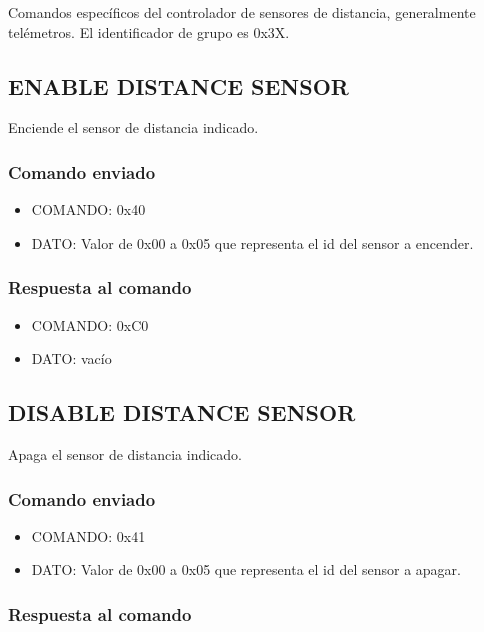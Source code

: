 \documentclass[a4paper,10pt]{article}
\begin{document}
Comandos espec\'ificos del controlador de sensores de distancia, generalmente tel\'emetros.
El identificador de grupo es 0x3X.

\subsection{ENABLE DISTANCE SENSOR}
\label{enable_distance_sensor}

Enciende el sensor de distancia indicado.

\subsubsection*{Comando enviado}

\begin{itemize}
	\item{COMANDO:} 0x40
	\item{DATO:} Valor de 0x00 a 0x05 que representa el id del sensor a encender.
\end{itemize}

\subsubsection*{Respuesta al comando}

\begin{itemize}
	\item{COMANDO:} 0xC0
	\item{DATO:} vac\'io
\end{itemize}

\subsection{DISABLE DISTANCE SENSOR}
\label{disable_distance_sensor}

Apaga el sensor de distancia indicado.

\subsubsection*{Comando enviado}

\begin{itemize}
	\item{COMANDO:} 0x41
	\item{DATO:} Valor de 0x00 a 0x05 que representa el id del sensor a apagar.
\end{itemize}

\subsubsection*{Respuesta al comando}
\end{document}
